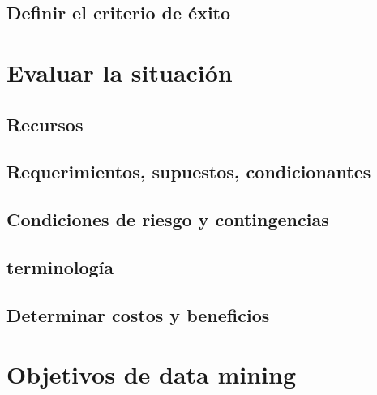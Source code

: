 \documentclass[11pt,a4paper,twoside]{tesis}
\begin{document}
\subsection{Definir el criterio de éxito}

\section{Evaluar la situación}
\subsection{Recursos}

\subsection{Requerimientos, supuestos, condicionantes}

\subsection{Condiciones de riesgo y contingencias}

\subsection{terminología}

\subsection{Determinar costos y beneficios}

\section{Objetivos de data mining}
\end{document}
